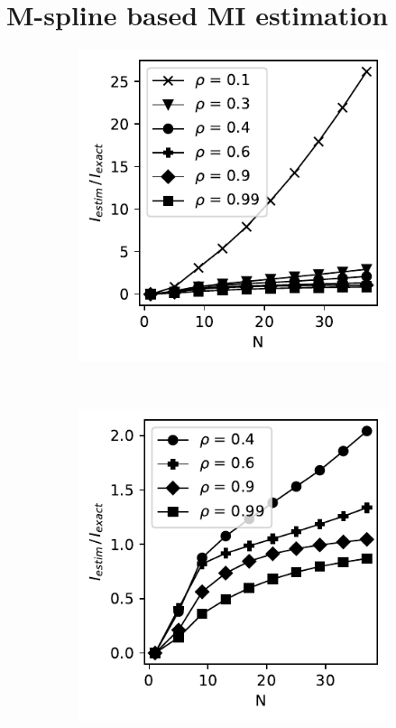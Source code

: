 \documentclass[../Thesis.tex]{subfiles}
\begin{document}
\section{M-spline based MI estimation}
\begin{figure}[H]
    \centering
    \begin{subfigure}[t]{0.32\textwidth}
        \centering
        \includegraphics[width=\linewidth]{figures/ND examples/MI calc/gaussian example original all - M-spline - relative error.pdf}
        \caption{}
    \end{subfigure}%
    ~
    \begin{subfigure}[t]{0.32\textwidth}
        \centering
        \includegraphics[width=\linewidth]{figures/ND examples/MI calc/gaussian example original zoom - M-spline - relative error.pdf}

\end{subfigure}
\end{figure}
\end{document}
